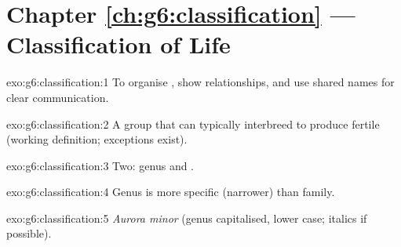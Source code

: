 \section*{Chapter \ref{ch:g6:classification} --- Classification of Life}

\begin{solution}{exo:g6:classification:1}
To organise , show relationships, and use shared names for
clear communication.
\end{solution}

\begin{solution}{exo:g6:classification:2}
A group that can typically interbreed to produce fertile 
(working definition; exceptions exist).
\end{solution}

\begin{solution}{exo:g6:classification:3}
Two: genus and .
\end{solution}

\begin{solution}{exo:g6:classification:4}
Genus is more specific (narrower) than family.
\end{solution}

\begin{solution}{exo:g6:classification:5}
\emph{Aurora minor} (genus capitalised,  lower case; italics if
possible).
\end{solution}

